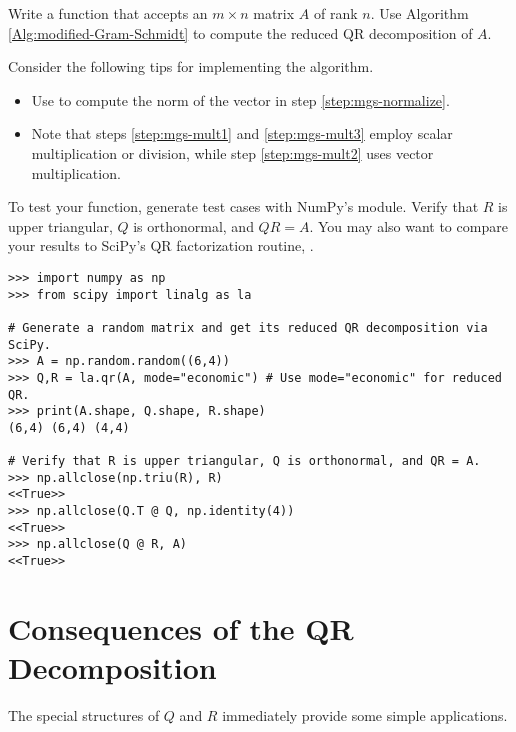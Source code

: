 \begin{problem} %
Write a function that accepts an $m \times n$ matrix $A$ of rank $n$.
Use Algorithm \ref{Alg:modified-Gram-Schmidt} to compute the reduced QR decomposition of $A$.

Consider the following tips for implementing the algorithm.
\begin{itemize}


\item Use  to compute the norm of the vector in step \ref{step:mgs-normalize}.

\item Note that steps \ref{step:mgs-mult1} and \ref{step:mgs-mult3} employ scalar multiplication or division, while step \ref{step:mgs-mult2} uses vector multiplication.

\end{itemize}

To test your function, generate test cases with NumPy's  module.
Verify that $R$ is upper triangular, $Q$ is orthonormal, and $QR = A$.
You may also want to compare your results to SciPy's QR factorization routine, .

\begin{lstlisting}
>>> import numpy as np
>>> from scipy import linalg as la

# Generate a random matrix and get its reduced QR decomposition via SciPy.
>>> A = np.random.random((6,4))
>>> Q,R = la.qr(A, mode="economic") # Use mode="economic" for reduced QR.
>>> print(A.shape, Q.shape, R.shape)
(6,4) (6,4) (4,4)

# Verify that R is upper triangular, Q is orthonormal, and QR = A.
>>> np.allclose(np.triu(R), R)
<<True>>
>>> np.allclose(Q.T @ Q, np.identity(4))
<<True>>
>>> np.allclose(Q @ R, A)
<<True>>
\end{lstlisting}
\label{prob:qr-via-mgs}
\end{problem}

\section*{Consequences of the QR Decomposition} %

The special structures of $Q$ and $R$ immediately provide some simple applications.

